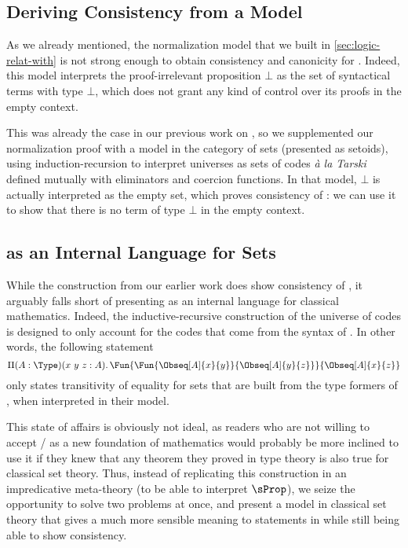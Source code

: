 \subsection{Deriving Consistency from a Model}

As we already mentioned, the normalization model that we built in
\cref{sec:logic-relat-with} is not strong enough to obtain consistency
and canonicity for \SetoidCC. Indeed, this model interprets the
proof-irrelevant proposition \( \bot \) as the set of syntactical
terms with type \( \bot \), which does not grant any kind of control
over its proofs in the empty context.

This was already the case in our previous work on \SetoidTT {}, 
so we supplemented our normalization proof with a model
in the category of sets (presented as setoids), using
induction-recursion to interpret universes as sets of codes \textit{à
  la Tarski} defined mutually with eliminators and coercion functions.
%
In that model, \( \bot \) is actually interpreted as the empty set, which
proves consistency of \SetoidTT: we can use it to show that there is
no term of type \( \bot \) in the empty context.

\subsection{\SetoidCC as an Internal Language for Sets}

While the construction from our earlier work \cite{pujet:hal-03367052} does 
show consistency of \SetoidTT, it arguably falls short of presenting \SetoidTT 
as an internal language for classical mathematics.
%
Indeed, the inductive-recursive construction of the universe of codes is
designed to only account for the codes that come from the syntax of
\SetoidTT. In other words, the following statement
\[
\Pi(A : \Type)(x\ y\ z : A).\,\Fun{\Fun{\Obseq[A]{x}{y}}{\Obseq[A]{y}{z}}}{\Obseq[A]{x}{z}}
\]
only states transitivity of equality for sets that are built from
the type formers of \SetoidTT, when interpreted in their model.

This state of affairs is obviously not ideal, as readers who are not
willing to accept \SetoidTT / \SetoidCC as a new foundation of mathematics would
probably be more inclined to use it if they knew that any theorem they
proved in type theory is also true for classical set theory.
%
Thus, instead of replicating this construction in an impredicative
meta-theory (to be able to interpret \( \sProp \)), we seize the
opportunity to solve two problems at once, and present a model in classical
set theory that gives a much more sensible meaning to statements in \SetoidCC
while still being able to show consistency.

